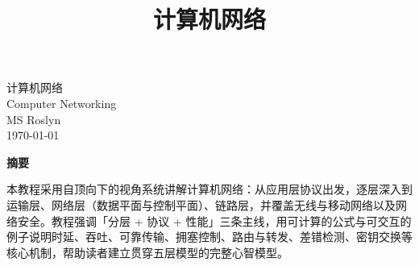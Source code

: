 \documentclass[12pt,a4paper]{ctexrep}
\title{\textbf{\huge 计算机网络}}
\author{}
\date{}
\begin{document}
\clearpage
\thispagestyle{empty}
\vspace*{\fill}

\begin{center}
{\huge 计算机网络}\\[0.8em]
{\large Computer Networking}\\[2.5em]
{\large MS Roslyn}\\[0.6em]
{\large \today}
\end{center}

\vspace{2.5em}

\begin{center}
{\bfseries 摘要}
\end{center}

\vspace{1em}

\begin{center}
本教程采用自顶向下的视角系统讲解计算机网络：从应用层协议出发，逐层深入到运输层、网络层（数据平面与控制平面）、链路层，并覆盖无线与移动网络以及网络安全。教程强调「分层 + 协议 + 性能」三条主线，用可计算的公式与可交互的例子说明时延、吞吐、可靠传输、拥塞控制、路由与转发、差错检测、密钥交换等核心机制，帮助读者建立贯穿五层模型的完整心智模型。
\end{center}

\vspace*{\fill}
\clearpage

\tableofcontents
\newpage

\clearpage

\clearpage

\clearpage

\clearpage

\clearpage

\clearpage

\clearpage

\clearpage

\end{document}
